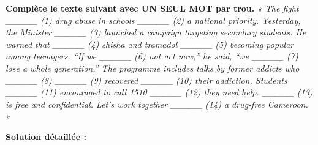 \documentclass[11pt]{article}
\begin{document}
\begin{exoresolu}
\textbf{Complète le texte suivant avec UN SEUL MOT par trou.}
\textit{« The fight \_\_\_\_\_ (1) drug abuse in schools \_\_\_\_\_ (2) a national priority. Yesterday, the Minister \_\_\_\_\_ (3) launched a campaign targeting secondary students. He warned that \_\_\_\_\_ (4) shisha and tramadol \_\_\_\_\_ (5) becoming popular among teenagers. ``If we \_\_\_\_\_ (6) not act now,'' he said, ``we \_\_\_\_\_ (7) lose a whole generation.'' The programme includes talks by former addicts who \_\_\_\_\_ (8) \_\_\_\_\_ (9) recovered \_\_\_\_\_ (10) their addiction. Students \_\_\_\_\_ (11) encouraged to call 1510 \_\_\_\_\_ (12) they need help. \_\_\_\_\_ (13) is free and confidential. Let's work together \_\_\_\_\_ (14) a drug-free Cameroon. »}

\tcblower
\textbf{Solution détaillée :}


\end{exoresolu}
\end{document}
